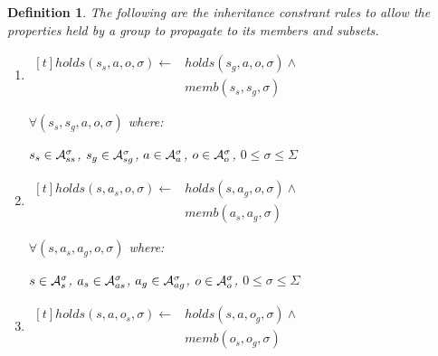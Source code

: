 \documentclass[10pt, twocolumn]{article}
\newtheorem{definition}{Definition}
\begin{document}
          \begin{definition}
            The following are the inheritance constrant rules to allow the
            properties held by a group to propagate to its members and
            subsets.

            \begin{enumerate}
              \item
                \begin{math}
                  \begin{aligned}[t]
                    holds(s_{s}, a, o, \sigma) \leftarrow &
                    holds(s_{g}, a, o, \sigma) \land \\
                    & memb(s_{s}, s_{g}, \sigma)
                  \end{aligned}
                \end{math}

                $\forall (s_{s}, s_{g}, a, o, \sigma)$ where:

                $s_{s} \in {\cal A}^{\sigma}_{ss}$,
                $s_{g} \in {\cal A}^{\sigma}_{sg}$,
                $a \in {\cal A}^{\sigma}_{a}$,
                $o \in {\cal A}^{\sigma}_{o}$,
                $0 \leq \sigma \leq \Sigma$
              \item
                \begin{math}
                  \begin{aligned}[t]
                    holds(s, a_{s}, o, \sigma) \leftarrow &
                    holds(s, a_{g}, o, \sigma) \land \\
                    & memb(a_{s}, a_{g}, \sigma)
                  \end{aligned}
                \end{math}

                $\forall (s, a_{s}, a_{g}, o, \sigma)$ where:

                $s \in {\cal A}^{\sigma}_{s}$,
                $a_{s} \in {\cal A}^{\sigma}_{as}$,
                $a_{g} \in {\cal A}^{\sigma}_{ag}$,
                $o \in {\cal A}^{\sigma}_{o}$,
                $0 \leq \sigma \leq \Sigma$
              \item
                \begin{math}
                  \begin{aligned}[t]
                    holds(s, a, o_{s}, \sigma) \leftarrow &
                    holds(s, a, o_{g}, \sigma) \land \\
                    & memb(o_{s}, o_{g}, \sigma)
                  \end{aligned}
                \end{math}


\end{enumerate}
\end{definition}
\end{document}
